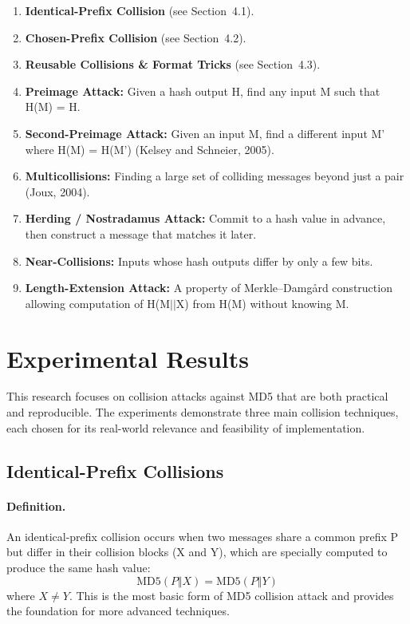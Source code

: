\documentclass[runningheads]{llncs}
\begin{document}
    \begin{enumerate}
        \item \textbf{Identical-Prefix Collision} (see Section~4.1).
        \item \textbf{Chosen-Prefix Collision} (see Section~4.2).
        \item \textbf{Reusable Collisions \& Format Tricks} (see Section~4.3).
        \item \textbf{Preimage Attack:} Given a hash output H, find any input M such that H(M) = H.
        \item \textbf{Second-Preimage Attack:} Given an input M, find a different input M' where H(M) = H(M') (Kelsey and Schneier, 2005).
        \item \textbf{Multicollisions:} Finding a large set of colliding messages beyond just a pair (Joux, 2004).
        \item \textbf{Herding / Nostradamus Attack:} Commit to a hash value in advance, then construct a message that matches it later.
        \item \textbf{Near-Collisions:} Inputs whose hash outputs differ by only a few bits.
        \item \textbf{Length-Extension Attack:} A property of Merkle–Damgård construction allowing computation of H(M$||$X) from H(M) without knowing M.
    \end{enumerate}

    \section{Experimental Results}
    This research focuses on collision attacks against MD5 that are both practical and reproducible. The experiments demonstrate three main collision techniques, each chosen for its real-world relevance and feasibility of implementation.


    \subsection{Identical-Prefix Collisions}

    \paragraph{Definition.}
    An identical-prefix collision occurs when two messages share a common prefix P but differ in their collision blocks (X and Y), which are specially computed to produce the same hash value:
    \[
        \mathrm{MD5}(P\Vert X)=\mathrm{MD5}(P\Vert Y)
    \]
    where $X \neq Y$. This is the most basic form of MD5 collision attack and provides the foundation for more advanced techniques.
\end{document}
